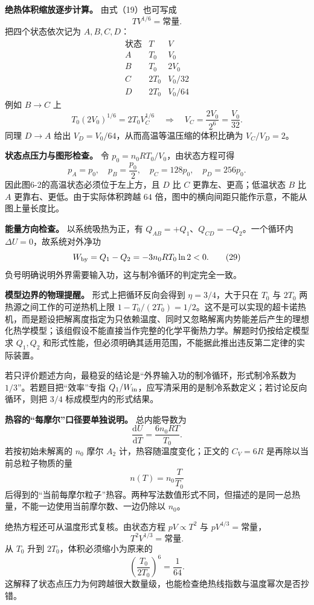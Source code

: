 \documentclass[12pt,a4paper,UTF8]{ctexart}
\begin{document}
\textbf{绝热体积缩放逐步计算。} 由式（19）也可写成 \[
TV^{1/6}=\text{常量}. \tag{25}
\] 把四个状态依次记为 \(A,B,C,D\)： \[
\begin{array}{c|c|c}
\text{状态}&T&V\\ \hline
A&T_0&V_0\\
B&T_0&2V_0\\
C&2T_0&V_0/32\\
D&2T_0&V_0/64
\end{array} \tag{26}
\] 例如 \(B\to C\) 上 \[
T_0(2V_0)^{1/6}=2T_0V_C^{1/6}
\quad\Longrightarrow\quad
V_C=\frac{2V_0}{2^6}=\frac{V_0}{32}. \tag{27}
\] 同理 \(D\to A\) 给出 \(V_D=V_0/64\)，从而高温等温压缩的体积比确为
\(V_C/V_D=2\)。

\textbf{状态点压力与图形检查。} 令 \(p_0=n_0RT_0/V_0\)，由状态方程可得
\[
p_A=p_0,\quad p_B=\frac{p_0}{2},\quad
p_C=128p_0,\quad p_D=256p_0. \tag{28}
\] 因此图6-2的高温状态必须位于左上方，且 \(D\) 比 \(C\)
更靠左、更高；低温状态 \(B\) 比 \(A\) 更靠右、更低。由于实际体积跨越
\(64\) 倍，图中的横向间距只能作示意，不能从图上量长度比。

\textbf{能量方向检查。} 以系统吸热为正，有
\(Q_{AB}=+Q_1\)、\(Q_{CD}=-Q_2\)。一个循环内
\(\Delta U=0\)，故系统对外净功 \[
W_{\rm by}=Q_1-Q_2=-3n_0RT_0\ln2<0. \tag{29}
\] 负号明确说明外界需要输入功，这与制冷循环的判定完全一致。

\textbf{模型边界的物理提醒。} 形式上把循环反向会得到
\(\eta=3/4\)，大于只在 \(T_0\) 与 \(2T_0\) 两热源之间工作的可逆热机上限
\(1-T_0/(2T_0)=1/2\)。这不是可以实现的超卡诺热机，而是题设把解离度指定为只依赖温度、同时又忽略解离内势能差后产生的理想化热学模型；该组假设不能直接当作完整的化学平衡热力学。解题时仍按给定模型求
\(Q_1,Q_2\)
和形式性能，但必须明确其适用范围，不能据此推出违反第二定律的实际装置。

若只评价题述方向，最稳妥的结论是``外界输入功的制冷循环，形式制冷系数为
\(1/3\)''。若题目把``效率''专指
\(Q_1/W_{\rm in}\)，应写清采用的是制冷系数定义；若讨论反向循环，则把
\(3/4\) 标成模型内的形式结果。

\textbf{热容的``每摩尔''口径要单独说明。} 总内能导数为 \[
\frac{\mathrm dU}{\mathrm dT}
=\frac{6n_0RT}{T_0}.
\] 若按初始未解离的 \(n_0\) 摩尔 \(A_2\) 计，热容随温度变化；正文的
\(C_V=6R\) 是再除以当前总粒子物质的量 \[
n(T)=n_0\frac{T}{T_0}
\]
后得到的``当前每摩尔粒子''热容。两种写法数值形式不同，但描述的是同一总热量，不能一边使用当前摩尔数、一边仍除以
\(n_0\)。

绝热方程还可从温度形式复核。由状态方程 \(pV\propto T^2\) 与
\(pV^{4/3}=\text{常量}\)， \[
T^2V^{1/3}=\text{常量}.
\] 从 \(T_0\) 升到 \(2T_0\)，体积必须缩小为原来的 \[
\left(\frac{T_0}{2T_0}\right)^6=\frac1{64}.
\]
这解释了状态点压力为何跨越很大数量级，也能检查绝热线指数与温度幂次是否抄错。
\end{document}

